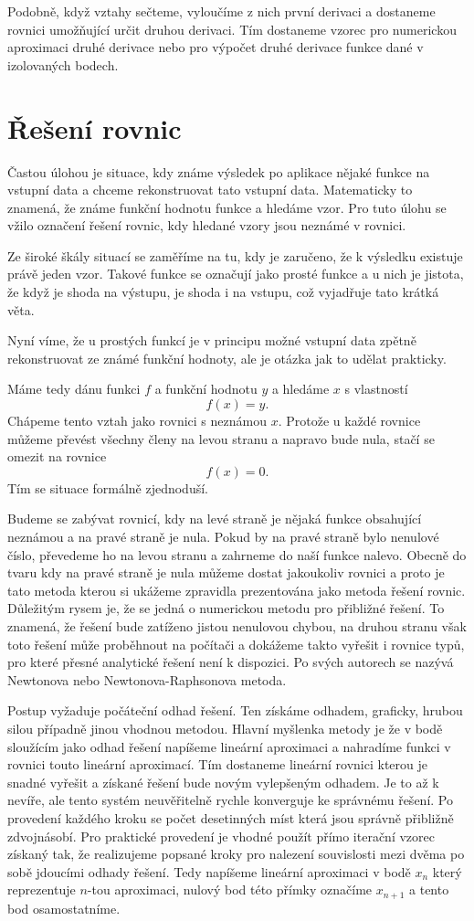 \documentclass[12pt]{article}
\begin{document}
Podobně, když vztahy sečteme, vyloučíme z nich první derivaci a dostaneme rovnici umožňující určit druhou derivaci. Tím dostaneme vzorec pro numerickou aproximaci druhé derivace nebo pro výpočet druhé derivace funkce dané v izolovaných bodech.

\section*{Řešení rovnic}

Častou úlohou je situace, kdy známe výsledek po aplikace nějaké funkce na vstupní data a chceme rekonstruovat tato vstupní data. Matematicky to znamená, že známe funkční hodnotu funkce a hledáme vzor. Pro tuto úlohu se vžilo označení řešení rovnic, kdy hledané vzory jsou neznámé v rovnici.

Ze široké škály situací se zaměříme na tu, kdy je zaručeno, že k výsledku existuje právě jeden vzor. Takové funkce se označují jako prosté funkce a u nich je jistota, že když je shoda na výstupu, je shoda i na vstupu, což vyjadřuje tato krátká věta.

Nyní víme, že u prostých funkcí je v principu možné vstupní data zpětně rekonstruovat ze známé funkční hodnoty, ale je otázka jak to udělat prakticky.

Máme tedy dánu funkci $f$ a funkční hodnotu $y$ a hledáme $x$ s vlastností $$f(x)=y.$$ Chápeme tento vztah jako rovnici s neznámou $x$. Protože u každé rovnice můžeme převést všechny členy na levou stranu a napravo bude nula, stačí se omezit na rovnice $$f(x)=0.$$ Tím se situace formálně zjednoduší.

Budeme se zabývat rovnicí, kdy na levé straně je nějaká funkce obsahující neznámou a na pravé straně je nula. Pokud by na pravé straně bylo nenulové číslo, převedeme ho na levou stranu a zahrneme do naší funkce nalevo. Obecně do tvaru kdy na pravé straně je nula můžeme dostat jakoukoliv rovnici a proto je tato metoda kterou si ukážeme zpravidla prezentována jako metoda řešení rovnic. Důležitým rysem je, že se jedná o numerickou metodu pro přibližné řešení. To znamená, že řešení bude zatíženo jistou nenulovou chybou, na druhou stranu však toto řešení může proběhnout na počítači a dokážeme takto vyřešit i rovnice typů, pro které přesné analytické řešení není k dispozici. Po svých autorech se nazývá Newtonova nebo Newtonova-Raphsonova metoda.

Postup vyžaduje počáteční odhad řešení. Ten získáme odhadem, graficky, hrubou silou případně jinou vhodnou metodou. Hlavní myšlenka metody je že v bodě sloužícím jako odhad řešení napíšeme lineární aproximaci a nahradíme funkci v rovnici touto lineární aproximací. Tím dostaneme lineární rovnici kterou je snadné vyřešit a získané řešení bude novým vylepšeným odhadem. Je to až k nevíře, ale tento systém neuvěřitelně rychle konverguje ke správnému řešení. Po provedení každého kroku se počet desetinných míst která jsou správně přibližně zdvojnásobí. Pro praktické provedení je vhodné použít přímo iterační vzorec získaný tak, že realizujeme popsané kroky pro nalezení souvislosti mezi dvěma po sobě jdoucími odhady řešení. Tedy napíšeme lineární aproximaci v bodě $x_n$ který reprezentuje $n$-tou aproximaci, nulový bod této přímky označíme $x_{n+1}$ a tento bod osamostatníme.
\end{document}

